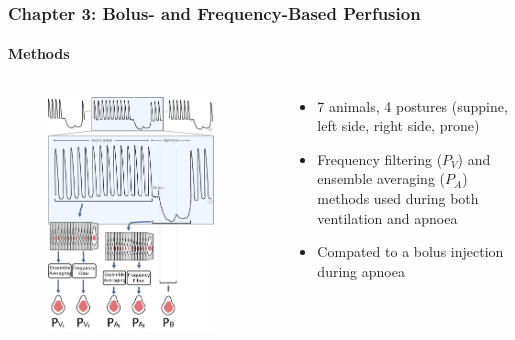 \documentclass[10pt,    %
    english,            %
    xcolor=table,       %
    envcountsect,        %
    aspectratio=1610
]{beamer}
\begin{document}
\begin{frame}
	\frametitle{Chapter 3: Bolus- and Frequency-Based Perfusion}
	\framesubtitle{Methods}
	\begin{columns}[c]
		\begin{column}{0.5\textwidth}
	\begin{figure}
		\centering
	\includegraphics[width=0.9\textwidth,trim={0 0 0 3.35cm},clip]{imgs/fig-methodsOverview.pdf}
	\end{figure}
\end{column}
\begin{column}{0.5\textwidth}
	\begin{itemize}
		\item 7 animals, 4 postures (suppine, left side, right side, prone)
		\item Frequency filtering ($P_V$) and ensemble averaging ($P_A$) methods used during both
		ventilation and apnoea
		\item Compated to a bolus injection during apnoea
	\end{itemize}
\end{column}
\end{columns}
\end{frame}
\end{document}
